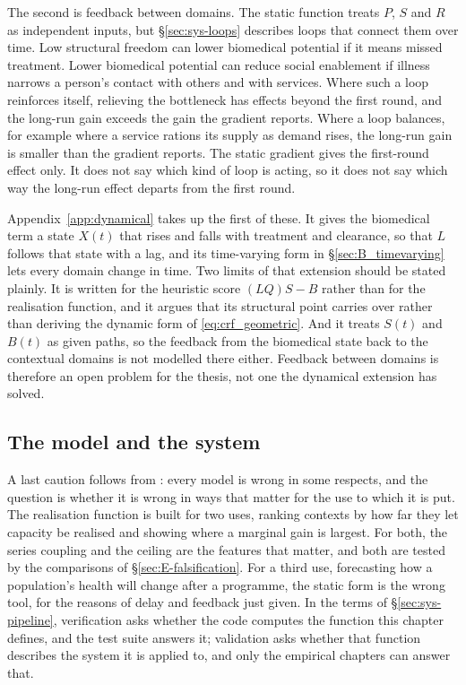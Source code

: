 The second is feedback between domains. The static function treats $P$, $S$
and $R$ as independent inputs, but \S\ref{sec:sys-loops} describes loops that
connect them over time. Low structural freedom can lower biomedical potential
if it means missed treatment. Lower biomedical potential can reduce social
enablement if illness narrows a person's contact with others and with
services. Where such a loop reinforces itself, relieving the bottleneck has
effects beyond the first round, and the long-run gain exceeds the gain the
gradient reports. Where a loop balances, for example where a service rations
its supply as demand rises, the long-run gain is smaller than the gradient
reports. The static gradient gives the first-round effect only. It does not say
which kind of loop is acting, so it does not say which way the long-run effect
departs from the first round.

Appendix~\ref{app:dynamical} takes up the first of these. It gives the
biomedical term a state $X(t)$ that rises and falls with treatment and
clearance, so that $L$ follows that state with a lag, and its time-varying form
in \S\ref{sec:B_timevarying} lets every domain change in time. Two limits of
that extension should be stated plainly. It is written for the heuristic score
$(LQ)S-B$ rather than for the realisation function, and it argues that its
structural point carries over rather than deriving the dynamic form of
\eqref{eq:crf_geometric}. And it treats $S(t)$ and $B(t)$ as given paths, so
the feedback from the biomedical state back to the contextual domains is not
modelled there either. Feedback between domains is therefore an open problem
for the thesis, not one the dynamical extension has solved.

\subsection{The model and the system}
A last caution follows from \citet{box_1976}: every model is wrong in some
respects, and the question is whether it is wrong in ways that matter for the
use to which it is put.
The realisation function is built for two uses, ranking contexts by how far
they let capacity be realised and showing where a marginal gain is largest. For
both, the series coupling and the ceiling are the features that matter, and
both are tested by the comparisons of \S\ref{sec:E-falsification}. For a third
use, forecasting how a population's health will change after a programme, the
static form is the wrong tool, for the reasons of delay and feedback just
given. In the terms of \S\ref{sec:sys-pipeline}, verification asks whether the
code computes the function this chapter defines, and the test suite answers it;
validation asks whether that function describes the system it is applied to,
and only the empirical chapters can answer that.

